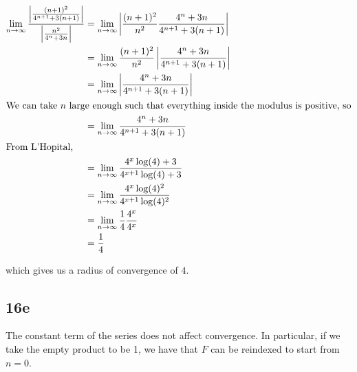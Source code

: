 \documentclass[12pt,letterpaper]{article}
\theoremstyle{definition}
\begin{document}
\begin{align*}
  \lim_{n \rightarrow \infty} \frac{\left|\frac{(n+1)^2}{4^{n+1}+3(n+1)}\right|}{\left|\frac{n^2}{4^{n}+3n}\right|} &= \lim_{n \rightarrow \infty} \left| \frac{(n+1)^2}{n^2} \frac{4^n + 3n}{4^{n+1}+3(n+1)} \right| \\
                                                                                                                    &= \lim_{n \rightarrow \infty}  \frac{(n+1)^2}{n^2} \left|\frac{4^n + 3n}{4^{n+1}+3(n+1)} \right| \\
                                                                                                                    &= \lim_{n \rightarrow \infty} \left|\frac{4^n + 3n}{4^{n+1}+3(n+1)} \right| \\
                                                                                                                    \intertext{We can take $n$ large enough such that everything inside the modulus is positive, so} 
                                                                                                                    &= \lim_{n \rightarrow \infty} \frac{4^n + 3n}{4^{n+1}+3(n+1)} \\
                                                                                                                    \intertext{From L'Hopital,}
                                                                                                                    &= \lim_{n \rightarrow \infty} \frac{4^x\log(4) + 3}{4^{x+1}\log(4) + 3} \\
                                                                                                                    &= \lim_{n \rightarrow \infty} \frac{4^x\log(4)^2}{4^{x+1}\log(4)^2} \\
                                                                                                                    &= \lim_{n \rightarrow \infty} \frac{1}{4}\frac{4^x}{4^{x}} \\
                                                                                                                    &= \frac{1}{4}
\end{align*}

which gives us a radius of convergence of $4$.

\subsection*{16e}

The constant term of the series does not affect convergence. In particular, if we take the empty product to be 1, we have that $F$ can be reindexed to start from $n = 0$.
\end{document}
